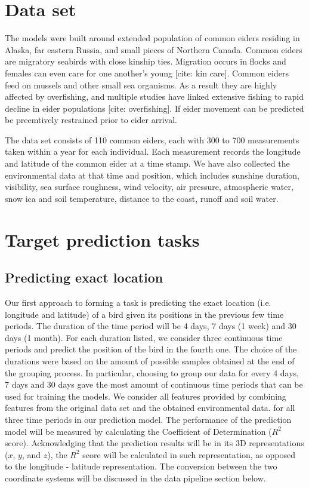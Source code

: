 \documentclass[10pt,conference]{IEEEtran}
\begin{document}
\section{Data set}
    The models were built around extended population of common eiders residing in Alaska, far eastern Russia, and small pieces of Northern Canada.  Common eiders are migratory seabirds with close kinship ties.  Migration occurs in flocks and females can even care for one another's young [cite: kin care].  Common eiders feed on mussels and other small sea organisms.  As a result they are highly affected by overfishing, and multiple studies have linked extensive fishing to rapid decline in eider populations [cite: overfishing].  If eider movement can be predicted  be preemtively restrained prior to eider arrival.

    The data set consists of 110 common eiders, each with 300 to 700 measurements taken within a year for each individual. Each measurement records the longitude and latitude of the common eider at a time stamp. We have also collected the environmental data at that time and position, which includes sunshine duration, visibility, sea surface roughness, wind velocity, air pressure, atmospheric water, snow ica and soil temperature, distance to the coast, runoff and soil water.
    
    
\section{Target prediction tasks}
\subsection{Predicting exact location}
    Our first approach to forming a task is predicting the exact location (i.e. longitude and latitude) of a bird given its positions in the previous few time periods. The duration of the time period will be 4 days, 7 days (1 week) and 30 days (1 month). For each duration listed, we consider three continuous time periods and predict the position of the bird in the fourth one. The choice of the durations were based on the amount of possible samples obtained at the end of the grouping process. In particular, choosing to group our data for every 4 days, 7 days and 30 days gave the most amount of continuous time periods that can be used for training the models. We consider all features provided by combining features from the original data set and the obtained environmental data. for all three time periods in our prediction model. The performance of the prediction model will be measured by calculating the Coefficient of Determination ($R^2$ score). Acknowledging that the prediction results will be in its 3D representations ($x$, $y$, and $z$), the $R^2$ score will be calculated in such representation, as opposed to the longitude - latitude representation. The conversion between the two coordinate systems will be discussed in the data pipeline section below.
\end{document}
